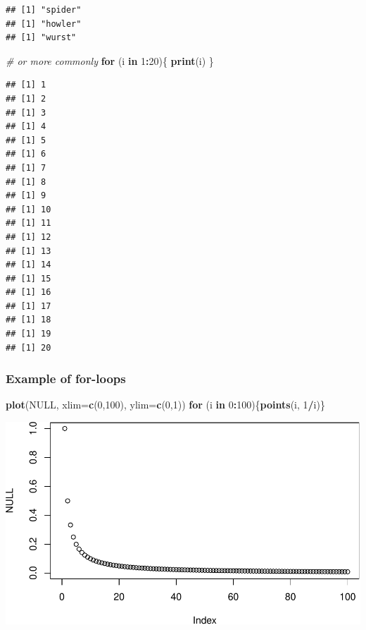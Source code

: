 \documentclass[]{article}
\newenvironment{Shaded}{\begin{snugshade}}{\end{snugshade}}
\newcommand{\KeywordTok}[1]{\textcolor[rgb]{0.13,0.29,0.53}{\textbf{#1}}}
\newcommand{\DataTypeTok}[1]{\textcolor[rgb]{0.13,0.29,0.53}{#1}}
\newcommand{\DecValTok}[1]{\textcolor[rgb]{0.00,0.00,0.81}{#1}}
\newcommand{\CommentTok}[1]{\textcolor[rgb]{0.56,0.35,0.01}{\textit{#1}}}
\newcommand{\OtherTok}[1]{\textcolor[rgb]{0.56,0.35,0.01}{#1}}
\newcommand{\ControlFlowTok}[1]{\textcolor[rgb]{0.13,0.29,0.53}{\textbf{#1}}}
\newcommand{\OperatorTok}[1]{\textcolor[rgb]{0.81,0.36,0.00}{\textbf{#1}}}
\newcommand{\NormalTok}[1]{#1}
\begin{document}
\begin{verbatim}
## [1] "spider"
## [1] "howler"
## [1] "wurst"
\end{verbatim}

\begin{Shaded}
\begin{Highlighting}[]
\CommentTok{# or more commonly}
\ControlFlowTok{for}\NormalTok{ (i }\ControlFlowTok{in} \DecValTok{1}\OperatorTok{:}\DecValTok{20}\NormalTok{)\{}
  \KeywordTok{print}\NormalTok{(i)}
\NormalTok{\}}
\end{Highlighting}
\end{Shaded}

\begin{verbatim}
## [1] 1
## [1] 2
## [1] 3
## [1] 4
## [1] 5
## [1] 6
## [1] 7
## [1] 8
## [1] 9
## [1] 10
## [1] 11
## [1] 12
## [1] 13
## [1] 14
## [1] 15
## [1] 16
## [1] 17
## [1] 18
## [1] 19
## [1] 20
\end{verbatim}

\subsubsection{Example of for-loops}\label{example-of-for-loops}

\begin{Shaded}
\begin{Highlighting}[]
\KeywordTok{plot}\NormalTok{(}\OtherTok{NULL}\NormalTok{, }\DataTypeTok{xlim=}\KeywordTok{c}\NormalTok{(}\DecValTok{0}\NormalTok{,}\DecValTok{100}\NormalTok{), }\DataTypeTok{ylim=}\KeywordTok{c}\NormalTok{(}\DecValTok{0}\NormalTok{,}\DecValTok{1}\NormalTok{))}
\ControlFlowTok{for}\NormalTok{ (i }\ControlFlowTok{in} \DecValTok{0}\OperatorTok{:}\DecValTok{100}\NormalTok{)\{}\KeywordTok{points}\NormalTok{(i, }\DecValTok{1}\OperatorTok{/}\NormalTok{i)\}}
\end{Highlighting}
\end{Shaded}

\includegraphics{Lab4_Matrix_Algebra_Functions_files/figure-latex/for2-1.pdf}
\end{document}
